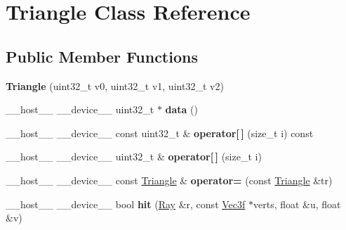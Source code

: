 \hypertarget{class_triangle}{}\section{Triangle Class Reference}
\label{class_triangle}
\subsection*{Public Member Functions}
\begin{DoxyCompactItemize}
\item 
{\bfseries Triangle} (uint32\+\_\+t v0, uint32\+\_\+t v1, uint32\+\_\+t v2)\hypertarget{class_triangle_a8532ce36a26abc9ab0064533ee880b67}{}\label{class_triangle_a8532ce36a26abc9ab0064533ee880b67}

\item 
\+\_\+\+\_\+host\+\_\+\+\_\+ \+\_\+\+\_\+device\+\_\+\+\_\+ uint32\+\_\+t $\ast$ {\bfseries data} ()\hypertarget{class_triangle_a100d35fe94ff02922981eabe1730f9f4}{}\label{class_triangle_a100d35fe94ff02922981eabe1730f9f4}

\item 
\+\_\+\+\_\+host\+\_\+\+\_\+ \+\_\+\+\_\+device\+\_\+\+\_\+ const uint32\+\_\+t \& {\bfseries operator\mbox{[}$\,$\mbox{]}} (size\+\_\+t i) const\hypertarget{class_triangle_a9ac6b64d26db74a4227eca4a0b3a437b}{}\label{class_triangle_a9ac6b64d26db74a4227eca4a0b3a437b}

\item 
\+\_\+\+\_\+host\+\_\+\+\_\+ \+\_\+\+\_\+device\+\_\+\+\_\+ uint32\+\_\+t \& {\bfseries operator\mbox{[}$\,$\mbox{]}} (size\+\_\+t i)\hypertarget{class_triangle_a51ae109c4a21132769252965eb4745e8}{}\label{class_triangle_a51ae109c4a21132769252965eb4745e8}

\item 
\+\_\+\+\_\+host\+\_\+\+\_\+ \+\_\+\+\_\+device\+\_\+\+\_\+ const \hyperlink{class_triangle}{Triangle} \& {\bfseries operator=} (const \hyperlink{class_triangle}{Triangle} \&tr)\hypertarget{class_triangle_a957601b66c9bc185e081a9c0b16a11ad}{}\label{class_triangle_a957601b66c9bc185e081a9c0b16a11ad}

\item 
\+\_\+\+\_\+host\+\_\+\+\_\+ \+\_\+\+\_\+device\+\_\+\+\_\+ bool {\bfseries hit} (\hyperlink{class_ray}{Ray} \&r, const \hyperlink{class_vec3}{Vec3f} $\ast$verts, float \&u, float \&v)\hypertarget{class_triangle_a853b6db440f108fe7581e2fc8a90bdc9}{}\label{class_triangle_a853b6db440f108fe7581e2fc8a90bdc9}


\end{DoxyCompactItemize}
